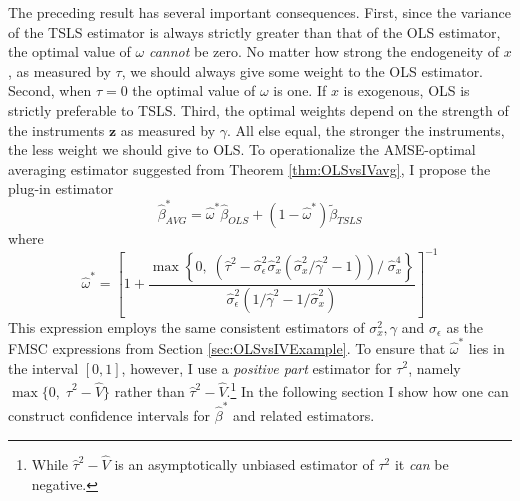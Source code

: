 The preceding result has several important consequences. 
First, since the variance of the TSLS estimator is always strictly greater than that of the OLS estimator, the optimal value of $\omega$ \emph{cannot} be zero. 
No matter how strong the endogeneity of $x$,
as measured by $\tau$, we should always give some weight to the OLS estimator. 
Second, when $\tau = 0$ the optimal value of $\omega$ is one. If $x$ is exogenous, OLS is strictly preferable to TSLS. 
Third, the optimal weights depend on the strength of the instruments $\mathbf{z}$ as measured by $\gamma$.
All else equal, the stronger the instruments, the less weight we should give to OLS.
To operationalize the AMSE-optimal averaging estimator suggested from Theorem \ref{thm:OLSvsIVavg}, I propose the plug-in estimator 
\begin{equation}
	\widehat{\beta}^*_{AVG} = \widehat{\omega}^* \widehat{\beta}_{OLS} + (1 - \widehat{\omega}^*)\widetilde{\beta}_{TSLS}
	\label{eq:OLSvsIV_AVG1}
\end{equation}
where
\begin{equation}
\widehat{\omega }^* = \left[1 + \frac{\max \left\{0, \; \left(\widehat{\tau}^2 - \widehat{\sigma}_\epsilon^2\widehat{\sigma}_x^2  \left(\widehat{\sigma}_x^2/\widehat{\gamma}^2 - 1 \right) \right)/\;\widehat{\sigma}_x^4 \right\}}{\widehat{\sigma}_\epsilon^2 (1/\widehat{\gamma}^2 - 1/\widehat{\sigma}_x^2)}\right]^{-1}
	\label{eq:OLSvsIV_AVG2}
\end{equation}
This expression employs the same consistent estimators of $\sigma_x^2, \gamma$ and $\sigma_{\epsilon}$ as the FMSC expressions from Section \ref{sec:OLSvsIVExample}.
To ensure that $\widehat{\omega}^*$ lies in the interval $[0,1]$, however, I use a \emph{positive part} estimator for $\tau^2$, namely $\max\{0, \; \widehat{\tau}^2 - \widehat{V}\}$ rather than $\widehat{\tau}^2 - \widehat{V}$.\footnote{While $\widehat{\tau}^2 - \widehat{V}$ is an asymptotically unbiased estimator of $\tau^2$ it \emph{can} be negative.}
In the following section I show how one can construct confidence intervals for $\widehat{\beta}^*$ and related estimators.
